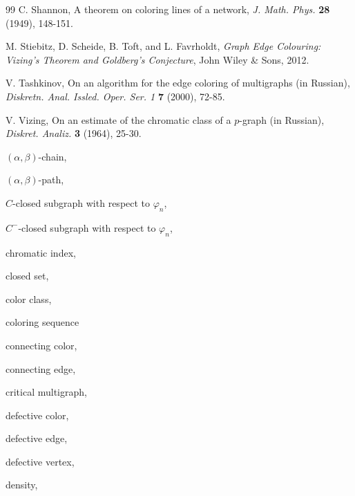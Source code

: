 \documentclass[11pt]{article}
\begin{document}
\begin{thebibliography}{99}
\vspace{-2mm}
 C. Shannon, A theorem on coloring lines of a network, {\em J. Math. Phys.}
{\bf 28} (1949), 148-151.

\vspace{-2mm}
 M. Stiebitz, D. Scheide, B. Toft, and L. Favrholdt, {\em Graph Edge Colouring: Vizing's Theorem and
Goldberg's Conjecture}, John Wiley \& Sons, 2012.

\vspace{-2mm}
 V. Tashkinov, On an algorithm for the edge coloring of multigraphs (in Russian),
{\em Diskretn. Anal. Issled. Oper. Ser. 1} {\bf 7} (2000), 72-85.

\vspace{-2mm}
 V. Vizing, On an estimate of the chromatic class of a $p$-graph (in Russian),
{\em Diskret. Analiz.} {\bf 3} (1964), 25-30.

\end{thebibliography}

\newpage


\vskip 5mm

\noindent $(\alpha, \beta)$-chain,~\pageref{alphabetapath}

\noindent $(\alpha, \beta)$-path,~\pageref{alphabetapath}

\noindent $C$-closed subgraph with respect to $\varphi_n$,~\pageref{cclosed}

\noindent $C^-$-closed subgraph with respect to $\varphi_n$,~\pageref{cclosed}

\noindent chromatic index,~\pageref{cindex}

\noindent closed set,~\pageref{closedsets}

\noindent color class,~\pageref{colorclass}

\noindent coloring sequence~\pageref{coloringsequence}

\noindent connecting color,~\pageref{connectingcolor}

\noindent connecting edge,~\pageref{connectingedge}

\noindent critical multigraph,~\pageref{critical}

\noindent defective color,~\pageref{defectivecolor}

\noindent defective edge,~\pageref{defectiveedge}

\noindent defective vertex,~\pageref{defectivevertex}

\noindent density,~\pageref{density}
\end{document}
